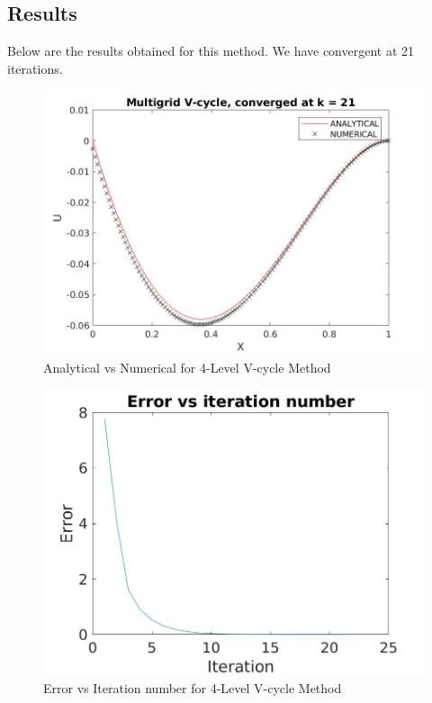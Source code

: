 \documentclass{article}
\begin{document}
\newpage
\subsection{Results}
Below are the results obtained for this method. We have convergent at 21 iterations. 

\begin{figure}[H]
	\includegraphics[width=\linewidth]{vcycle.jpg}	
	\caption{Analytical vs Numerical for 4-Level V-cycle Method}
\end{figure}

\begin{figure}[H]
	\includegraphics[width=\linewidth]{vcycle_error.jpg}	
	\caption{Error vs Iteration number for 4-Level V-cycle Method}
\end{figure}
\end{document}
